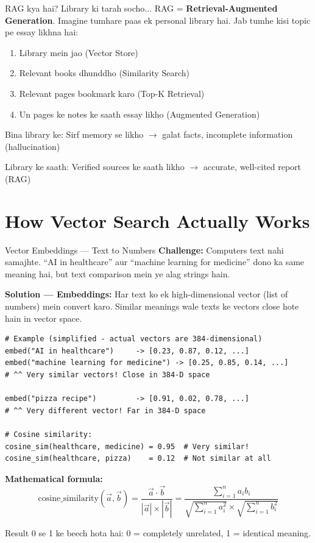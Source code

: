 \documentclass[11pt,a4paper,twoside]{report}
\begin{document}
\begin{storybox}{RAG kya hai? Library ki tarah socho...}
RAG = \textbf{Retrieval-Augmented Generation}. Imagine tumhare paas ek personal library hai. Jab tumhe kisi topic pe essay likhna hai:
\begin{enumerate}
    \item Library mein jao (Vector Store)
    \item Relevant books dhunddho (Similarity Search)
    \item Relevant pages bookmark karo (Top-K Retrieval)
    \item Un pages ke notes ke saath essay likho (Augmented Generation)
\end{enumerate}
Bina library ke: Sirf memory se likho $\rightarrow$ galat facts, incomplete information (hallucination)

Library ke saath: Verified sources ke saath likho $\rightarrow$ accurate, well-cited report (RAG)
\end{storybox}

\section{How Vector Search Actually Works}

\begin{conceptbox}{Vector Embeddings --- Text to Numbers}
\textbf{Challenge:} Computers text nahi samajhte. ``AI in healthcare'' aur ``machine learning for medicine'' dono ka same meaning hai, but text comparison mein ye alag strings hain.

\textbf{Solution --- Embeddings:} Har text ko ek high-dimensional vector (list of numbers) mein convert karo. Similar meanings wale texts ke vectors close hote hain in vector space.

\begin{lstlisting}[style=pythonstyle]
# Example (simplified - actual vectors are 384-dimensional)
embed("AI in healthcare")     -> [0.23, 0.87, 0.12, ...]
embed("machine learning for medicine") -> [0.25, 0.85, 0.14, ...]
# ^^ Very similar vectors! Close in 384-D space

embed("pizza recipe")         -> [0.91, 0.02, 0.78, ...]
# ^^ Very different vector! Far in 384-D space

# Cosine similarity:
cosine_sim(healthcare, medicine) = 0.95  # Very similar!
cosine_sim(healthcare, pizza)    = 0.12  # Not similar at all
\end{lstlisting}

\textbf{Mathematical formula:}
$$\text{cosine\_similarity}(\vec{a}, \vec{b}) = \frac{\vec{a} \cdot \vec{b}}{|\vec{a}| \times |\vec{b}|} = \frac{\sum_{i=1}^{n} a_i b_i}{\sqrt{\sum_{i=1}^{n} a_i^2} \times \sqrt{\sum_{i=1}^{n} b_i^2}}$$

Result 0 se 1 ke beech hota hai: 0 = completely unrelated, 1 = identical meaning.
\end{conceptbox}
\end{document}
